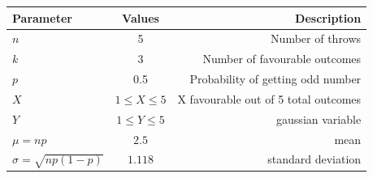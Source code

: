 \documentclass[journal,12pt,twocolumn]{IEEEtran}
\theoremstyle{remark}
\begin{document}
\solution
\fi
\begin{table}[h!]
 \begin{center}
    \begin{tabular}{|l|c|r|}
    \hline
    Parameter & Values & Description\\
    \hline
    $n$ & 5 & Number of throws\\
    \hline
    $k$ & 3 & Number of favourable outcomes\\
    \hline
    $p$ & 0.5 & Probability of getting odd number\\
    \hline
    $X$ & $1\leq X \leq 5$
    & X favourable out of 5 total outcomes\\
    \hline
    $Y$ & $1\leq Y \leq 5$
    & gaussian variable\\
    \hline
    $\mu=np$ & $2.5$ & mean\\
    \hline
    $\sigma=\sqrt{np(1-p)}$ & $1.118$ & standard deviation\\
    \hline
    \end{tabular}
    \end{center}
\end{table}
\end{document}
